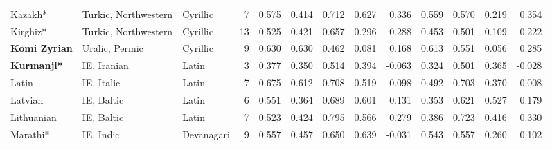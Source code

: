 \begin{tabular}{lllrrrrrrrrrr}
                Kazakh* &            Turkic, Northwestern &   Cyrillic &         7 &                       0.575 &                         0.414 &         0.712 &                  0.627 &            0.336 &                         0.559 &         0.570 &                  0.219 &            0.354 \\
               Kirghiz* &            Turkic, Northwestern &   Cyrillic &        13 &                       0.525 &                         0.421 &         0.657 &                  0.296 &            0.288 &                         0.453 &         0.501 &                  0.109 &            0.222 \\
   \textbf{Komi Zyrian} &                  Uralic, Permic &   Cyrillic &         9 &                       0.630 &                         0.630 &         0.462 &                  0.081 &            0.168 &                         0.613 &         0.551 &                  0.056 &            0.285 \\
     \textbf{Kurmanji*} &                     IE, Iranian &      Latin &         3 &                       0.377 &                         0.350 &         0.514 &                  0.394 &           -0.063 &                         0.324 &         0.501 &                  0.365 &           -0.028 \\
                  Latin &                      IE, Italic &      Latin &         7 &                       0.675 &                         0.612 &         0.708 &                  0.519 &           -0.098 &                         0.492 &         0.703 &                  0.370 &           -0.008 \\
                Latvian &                      IE, Baltic &      Latin &         6 &                       0.551 &                         0.364 &         0.689 &                  0.601 &            0.131 &                         0.353 &         0.621 &                  0.527 &            0.179 \\
             Lithuanian &                      IE, Baltic &      Latin &         7 &                       0.523 &                         0.424 &         0.795 &                  0.566 &            0.279 &                         0.386 &         0.723 &                  0.416 &            0.330 \\
               Marathi* &                       IE, Indic & Devanagari &         9 &                       0.557 &                         0.457 &         0.650 &                  0.639 &           -0.031 &                         0.543 &         0.557 &                  0.260 &            0.102 \\

\end{tabular}
